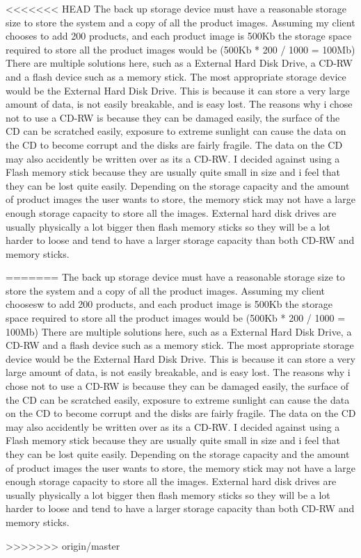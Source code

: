 <<<<<<< HEAD
The back up storage device must have a reasonable storage size to store the system and a copy of all the product images. Assuming my client chooses to add 200 products, and each product image is 500Kb the storage space required to store all the product images would be (500Kb * 200 / 1000 = 100Mb) There are multiple solutions here, such as a External Hard Disk Drive, a CD-RW and a flash device such as a memory stick.  The most appropriate storage device would be the External Hard Disk Drive. This is because it can store a very large amount of data, is not easily breakable, and is easy lost. The reasons why i chose not to use a CD-RW is because they can be damaged easily, the surface of the CD can be scratched easily, exposure to extreme sunlight can cause the data on the CD to become corrupt and the disks are fairly fragile. The data on the CD may also accidently be written over as its a CD-RW. I decided against using a Flash memory stick because they are usually quite small in size and i feel that they can be lost quite easily. Depending on the storage capacity and the amount of product images the user wants to store, the memory stick may not have a large enough storage capacity to store all the images. External hard disk drives are usually physically a lot bigger then flash memory sticks so they will be a lot harder to loose and tend to have a larger storage capacity than both CD-RW and memory sticks.\par
=======
The back up storage device must have a reasonable storage size to store the system and a copy of all the product images. Assuming my client choosesw to add 200 products, and each product image is 500Kb the storage space required to store all the product images would be (500Kb * 200 / 1000 = 100Mb) There are multiple solutions here, such as a External Hard Disk Drive, a CD-RW and a flash device such as a memory stick.  The most appropriate storage device would be the External Hard Disk Drive. This is because it can store a very large amount of data, is not easily breakable, and is easy lost. The reasons why i chose not to use a CD-RW is because they can be damaged easily, the surface of the CD can be scratched easily, exposure to extreme sunlight can cause the data on the CD to become corrupt and the disks are fairly fragile. The data on the CD may also accidently be written over as its a CD-RW. I decided against using a Flash memory stick because they are usually quite small in size and i feel that they can be lost quite easily. Depending on the storage capacity and the amount of product images the user wants to store, the memory stick may not have a large enough storage capacity to store all the images. External hard disk drives are usually physically a lot bigger then flash memory sticks so they will be a lot harder to loose and tend to have a larger storage capacity than both CD-RW and memory sticks.\par
>>>>>>> origin/master

